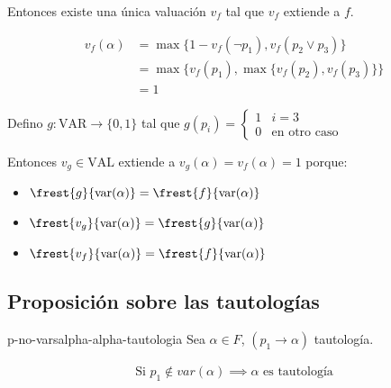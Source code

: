 \begin{itemize}
         Entonces existe una única valuación $v_f$ tal que $v_f$ 
         extiende a $f$.


         \begin{align*}
             v_f(\alpha) &= \max{\{ 1 - v_f(\neg p_1), v_f(p_2 \vee p_3) \}}\\
                         &= \max{\{ v_f(p_1),
                            \max{\{ v_f(p_2), v_f(p_3) \}} \}} \\
                         &= 1
         \end{align*}

         Defino $g: \mathrm{VAR} \to \{ 0, 1 \}$ tal que
         $g(p_i) = \begin{cases}
             1 & i = 3 \\
             0 & \text{en otro caso}
         \end{cases}$

        Entonces $v_g \in \mathrm{VAL}$ extiende a
        $v_g(\alpha) = v_f(\alpha) = 1$
        porque:
        \begin{itemize}
            \item $\frest{g}{\mathrm{var}(\alpha)} =
                \frest{f}{\mathrm{var}(\alpha)}$
        \item $\frest{v_g}{\mathrm{var}(\alpha)} =
            \frest{g}{\mathrm{var}(\alpha)}$
        \item $\frest{v_f}{\mathrm{var}(\alpha)} =
            \frest{f}{\mathrm{var}(\alpha)}$
        \end{itemize}
\end{itemize}


\subsection{Proposición sobre las tautologías}


%
\begin{proposicion}{}{p-no-varsalpha-alpha-tautologia}
    Sea $\alpha \in F$, $(p_1 \to \alpha)$ tautología.

    \medskip

   \begin{gather*}
       \text{Si } p_1 \notin var(\alpha) 
        \implies \alpha \text{ es tautología}
   \end{gather*} 
\end{proposicion}

